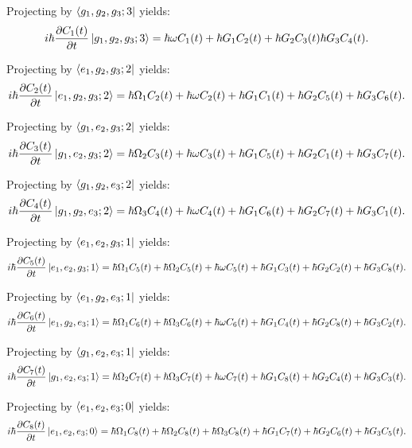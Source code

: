 \documentclass{article}
\theoremstyle{definition}
\begin{document}
Projecting by $\bra{g_{1}, g_{2}, g_{3}; 3}$ yields:\\
\[ i \hbar \frac{\partial C_{1}(t)}{\partial t} \ket{g_{1}, g_{2}, g_{3}; 3} = \hbar \omega C_{1}(t) + \hbar G_{1} C_{2}(t) + \hbar G_{2} C_{3}(t) \hbar G_{3} C_{4}(t). \]

Projecting by $\bra{e_{1}, g_{2}, g_{3}; 2}$ yields:\\
\[ i \hbar \frac{\partial C_{2}(t)}{\partial t} \ket{e_{1}, g_{2}, g_{3}; 2} = \hbar \Omega_{1}C_{2}(t) + \hbar \omega C_{2}(t) + \hbar G_{1}C_{1}(t) + \hbar G_{2}C_{5}(t) + \hbar G_{3}C_{6}(t). \]

Projecting by $\bra{g_{1}, e_{2}, g_{3}; 2}$ yields:\\
\[ i \hbar \frac{\partial C_{3}(t)}{\partial t} \ket{g_{1}, e_{2}, g_{3}; 2} = \hbar \Omega_{2}C_{3}(t) + \hbar \omega C_{3}(t) + \hbar G_{1}C_{5}(t) + \hbar G_{2}C_{1}(t) + \hbar G_{3}C_{7}(t). \]

Projecting by $\bra{g_{1}, g_{2}, e_{3}; 2}$ yields:\\
\[ i \hbar \frac{\partial C_{4}(t)}{\partial t} \ket{g_{1}, g_{2}, e_{3}; 2} = \hbar \Omega_{3}C_{4}(t) + \hbar \omega C_{4}(t) + \hbar G_{1}C_{6}(t) + \hbar G_{2}C_{7}(t) + \hbar G_{3}C_{1}(t). \]

Projecting by $\bra{e_{1}, e_{2}, g_{3}; 1}$ yields:\\
\[ i \hbar \frac{\partial C_{5}(t)}{\partial t} \ket{e_{1}, e_{2}, g_{3}; 1} = \hbar \Omega_{1}C_{5}(t) + \hbar \Omega_{2}C_{5}(t) + \hbar \omega C_{5}(t) + \hbar G_{1}C_{3}(t) + \hbar G_{2}C_{2}(t) + \hbar G_{3}C_{8}(t). \]

Projecting by $\bra{e_{1}, g_{2}, e_{3}; 1}$ yields:\\
\[ i \hbar \frac{\partial C_{6}(t)}{\partial t} \ket{e_{1}, g_{2}, e_{3}; 1} = \hbar \Omega_{1}C_{6}(t) + \hbar \Omega_{3}C_{6}(t) + \hbar \omega C_{6}(t) + \hbar G_{1}C_{4}(t) + \hbar G_{2}C_{8}(t) + \hbar G_{3}C_{2}(t). \]

Projecting by $\bra{g_{1}, e_{2}, e_{3}; 1}$ yields:\\
\[ i \hbar \frac{\partial C_{7}(t)}{\partial t} \ket{g_{1}, e_{2}, e_{3}; 1} = \hbar \Omega_{2}C_{7}(t) + \hbar \Omega_{3}C_{7}(t) + \hbar \omega C_{7}(t) + \hbar G_{1}C_{8}(t) + \hbar G_{2}C_{4}(t) + \hbar G_{3}C_{3}(t). \]

Projecting by $\bra{e_{1}, e_{2}, e_{3}; 0}$ yields:\\
\[ i \hbar \frac{\partial C_{8}(t)}{\partial t} \ket{e_{1}, e_{2}, e_{3}; 0} = \hbar \Omega_{1}C_{8}(t) + \hbar \Omega_{2}C_{8}(t) + \hbar \Omega_{3}C_{8}(t) + \hbar G_{1}C_{7}(t) + \hbar G_{2}C_{6}(t) + \hbar G_{3}C_{5}(t). \]
\end{document}
